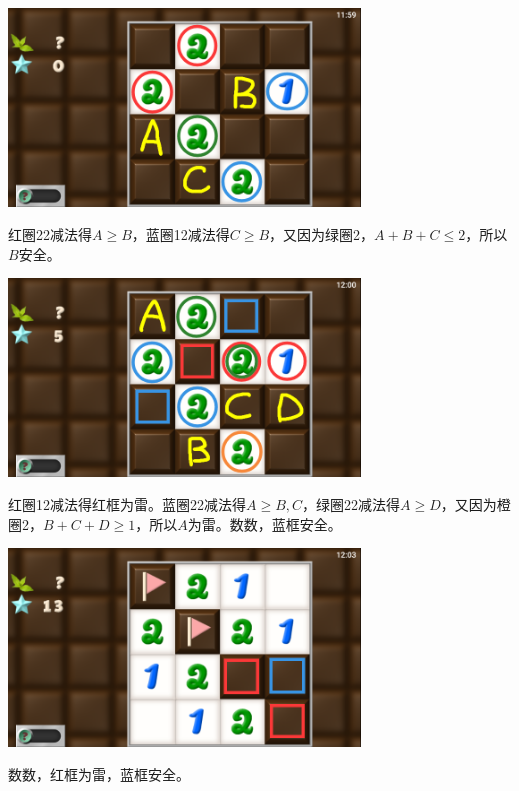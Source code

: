 \subsection{} %
\begin{center}
    \includegraphics[width=0.7\textwidth]{puzzle/171-1.png}
\end{center}
红圈22减法得$A\ge B$，蓝圈12减法得$C\ge B$，又因为绿圈2，$A+B+C\le 2$，所以$B$安全。
\begin{center}
    \includegraphics[width=0.7\textwidth]{puzzle/171-2.png}
\end{center}
红圈12减法得红框为雷。蓝圈22减法得$A\ge B,C$，绿圈22减法得$A\ge D$，又因为橙圈2，$B+C+D\ge 1$，所以$A$为雷。数数，蓝框安全。
\begin{center}
    \includegraphics[width=0.7\textwidth]{puzzle/171-3.png}
\end{center}
数数，红框为雷，蓝框安全。

